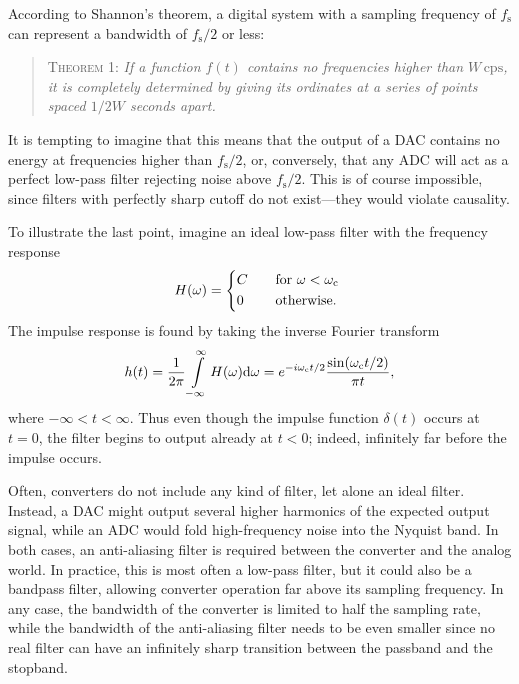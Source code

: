 According to Shannon's theorem, a digital system with a sampling frequency of
$f_\text{s}$ can represent a bandwidth of $f_\text{s}/2$ or less:
%
\begin{quote}
   \textsc{Theorem} 1: \emph{If a function $f(t)$ contains no frequencies higher
   than $W\,\text{cps}$, it is completely determined by giving its ordinates at
   a series of points spaced $1/2W$ seconds apart.}
   \cite{shannon1949communication}
\end{quote}
%
It is tempting to imagine that this means that the output of a DAC contains no
energy at frequencies higher than $f_\text{s}/2$, or, conversely, that any ADC
will act as a perfect low-pass filter rejecting noise above $f_\text{s}/2$. This
is of course impossible, since filters with perfectly sharp cutoff do not
exist---they would violate causality.

To illustrate the last point, imagine an ideal low-pass filter with the
frequency response
%
\begin{align*}
   H(\omega)=
    \begin{dcases*}
       C&\quad for $\omega<\omega_\text{c}$\\
       0&\quad otherwise.
    \end{dcases*}
\end{align*}
%
The impulse response is found by taking the inverse Fourier transform
%
\[
   h(t)=\frac{1}{2\pi}\int\limits_{-\infty}^{\infty}H(\omega)\mathrm{d}\omega=e^{-i\omega_\text{c}t/2}\frac{\sin(\omega_\text{c}t/2)}{\pi
   t},
\]
%
where $-\infty<t<\infty$. Thus even though the impulse function $\delta(t)$
occurs at $t=0$, the filter begins to output already at $t<0$; indeed,
infinitely far before the impulse occurs. \cite[sect~5.4.1]{proakis2006digital}

Often, converters do not include any kind of filter, let alone an ideal filter.
Instead, a DAC might output several higher harmonics of the expected output
signal, while an ADC would fold high-frequency noise into the Nyquist band. In
both cases, an anti-aliasing filter is required between the converter and the
analog world. In practice, this is most often a low-pass filter, but it could
also be a bandpass filter, allowing converter operation far above its sampling
frequency. In any case, the bandwidth of the converter is limited to half the
sampling rate, while the bandwidth of the anti-aliasing filter needs to be even
smaller since no real filter can have an infinitely sharp transition between the
passband and the stopband.

